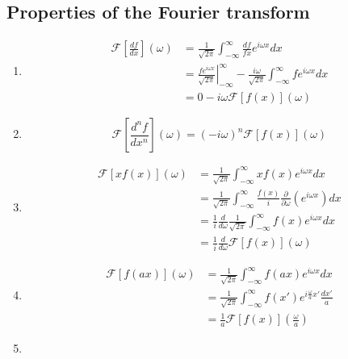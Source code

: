 \documentclass{../../physics_notes}
\begin{document}
\subsection{Properties of the Fourier transform}

\begin{enumerate}
	\item{
	\begin{align*}
	\mathcal{F}\left[\frac{df}{dx}\right](\omega) &= \frac{1}{\sqrt{2\pi}} \int_{-\infty}^\infty \frac{df}{fx} e^{i\omega x} dx \\
	&= \left.\frac{f e^{i\omega x}}{\sqrt{2\pi}}\right|^{\infty}_{-\infty} - \frac{i\omega}{\sqrt{2\pi}}\int^\infty_{-\infty} f e^{i\omega x} dx \\
	&= 0 - i\omega \mathcal{F}\left[f(x)\right](\omega)
	\end{align*}
	}
	\item{
	\[\mathcal{F}\left[\frac{d^n f}{dx^n}\right](\omega) = (- i\omega)^n \mathcal{F}\left[f(x)\right](\omega)\]
	}
	\item{
	\begin{align*}
	\mathcal{F}\left[x f(x)\right](\omega) &= \frac{1}{\sqrt{2\pi}} \int_{-\infty}^\infty x f(x) e^{i\omega x} dx \\
	&= \frac{1}{\sqrt{2\pi}} \int_{-\infty}^\infty \frac{f(x)}{i} \frac{\partial}{\partial\omega}\left(e^{i\omega x}\right) dx\\
	&= \frac{1}{i}\frac{d}{d\omega} \frac{1}{\sqrt{2\pi}}\int_{-\infty}^{\infty} f(x) e^{i\omega x} dx \\
	&= \frac{1}{i} \frac{d}{d\omega}\mathcal{F}\left[f(x)\right](\omega)
	\end{align*}
	}
	\item{
	\begin{align*}
	\mathcal{F}\left[f(ax)\right](\omega) &= \frac{1}{\sqrt{2\pi}} \int_{-\infty}^\infty f(ax)e^{i\omega x} dx \\
	&= \frac{1}{\sqrt{2\pi}} \int_{-\infty}^\infty f(x') e^{i\frac{\omega}{a}x'} \frac{dx'}{a} \\
	&= \frac{1}{a}\mathcal{F}\left[f(x)\right]\left(\frac{\omega}{a}\right)
	\end{align*}}
	\item{
}
\end{enumerate}
\end{document}
